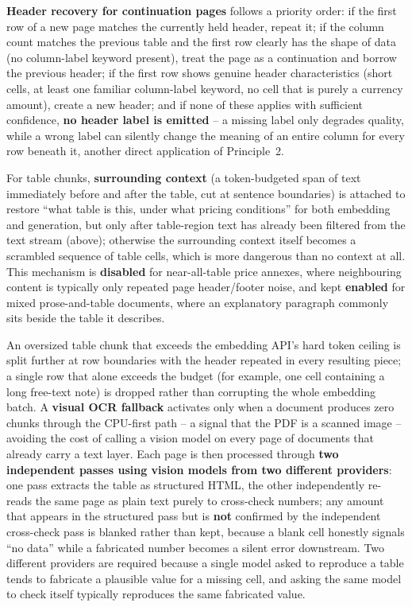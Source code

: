 \documentclass[11pt,a4paper]{article}
\begin{document}
\textbf{Header recovery for continuation pages} follows a priority order: if
the first row of a new page matches the currently held header, repeat it; if
the column count matches the previous table and the first row clearly has
the shape of data (no column-label keyword present), treat the page as a
continuation and borrow the previous header; if the first row shows genuine
header characteristics (short cells, at least one familiar column-label
keyword, no cell that is purely a currency amount), create a new header; and
if none of these applies with sufficient confidence, \textbf{no header
label is emitted} -- a missing label only degrades quality, while a wrong
label can silently change the meaning of an entire column for every row
beneath it, another direct application of Principle~2.

For table chunks, \textbf{surrounding context} (a token-budgeted span of
text immediately before and after the table, cut at sentence boundaries) is
attached to restore ``what table is this, under what pricing conditions''
for both embedding and generation, but only after table-region text has
already been filtered from the text stream (above); otherwise the
surrounding context itself becomes a scrambled sequence of table cells,
which is more dangerous than no context at all. This mechanism is
\textbf{disabled} for near-all-table price annexes, where neighbouring
content is typically only repeated page header/footer noise, and kept
\textbf{enabled} for mixed prose-and-table documents, where an explanatory
paragraph commonly sits beside the table it describes.

An oversized table chunk that exceeds the embedding API's hard token ceiling
is split further at row boundaries with the header repeated in every
resulting piece; a single row that alone exceeds the budget (for example, one
cell containing a long free-text note) is dropped rather than corrupting the
whole embedding batch. A \textbf{visual OCR fallback} activates only when a
document produces zero chunks through the CPU-first path -- a signal that the
PDF is a scanned image -- avoiding the cost of calling a vision model on
every page of documents that already carry a text layer. Each page is then
processed through \textbf{two independent passes using vision models from
two different providers}: one pass extracts the table as structured HTML,
the other independently re-reads the same page as plain text purely to
cross-check numbers; any amount that appears in the structured pass but is
\textbf{not} confirmed by the independent cross-check pass is blanked rather
than kept, because a blank cell honestly signals ``no data'' while a
fabricated number becomes a silent error downstream. Two different
providers are required because a single model asked to reproduce a table
tends to fabricate a plausible value for a missing cell, and asking the same
model to check itself typically reproduces the same fabricated value.
\end{document}
